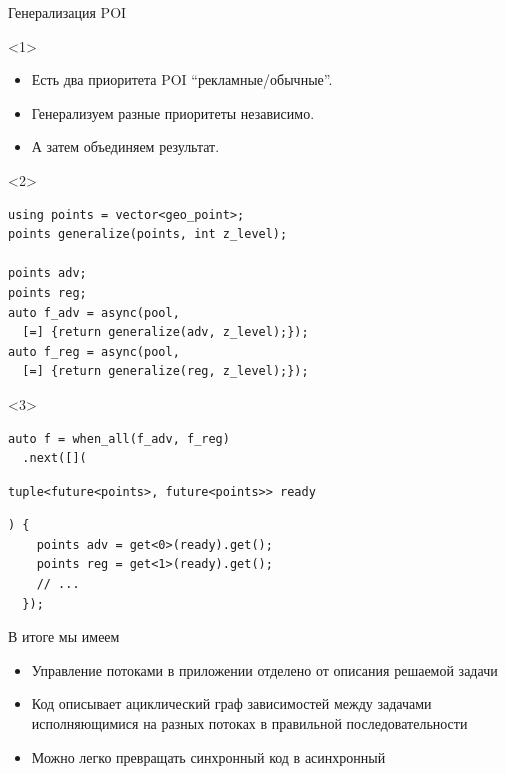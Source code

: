 \documentclass[aspectratio=169,hyperref={unicode},17pt]{beamer}
\begin{document}
\begin{frame}[fragile,t]{Генерализация POI}
\begin{onlyenv}<1>
\begin{itemize}
 \item Есть два приоритета POI ``рекламные/обычные''.
 \item Генерализуем разные приоритеты независимо.
 \item А затем объединяем результат.
\end{itemize}
\end{onlyenv}
\begin{onlyenv}<2>
\begin{lstlisting}[style=cppcode]
using points = vector<geo_point>;
points generalize(points, int z_level);

points adv;
points reg;
auto f_adv = async(pool,
  [=] {return generalize(adv, z_level);});
auto f_reg = async(pool,
  [=] {return generalize(reg, z_level);});
\end{lstlisting}
\end{onlyenv}
\begin{onlyenv}<3>
\begin{lstlisting}[style=cppcode,aboveskip=0pt,belowskip=0pt]
auto f = when_all(f_adv, f_reg)
  .next([](
\end{lstlisting}
\begin{lstlisting}[style=cppcode,backgroundcolor=\color{gray!30},aboveskip=0pt,belowskip=0pt]
    tuple<future<points>, future<points>> ready
\end{lstlisting}
\begin{lstlisting}[style=cppcode,aboveskip=0pt,belowskip=0pt]
  ) {
    points adv = get<0>(ready).get();
    points reg = get<1>(ready).get();
    // ...
  });
\end{lstlisting}
\end{onlyenv}
\end{frame}

\begin{frame}[fragile,t]{В итоге мы имеем}
\begin{itemize}[<+->]
 \item Управление потоками в приложении отделено от описания решаемой задачи
 \item Код описывает ациклический граф зависимостей между задачами исполняющимися на разных потоках в правильной последовательности
 \item Можно легко превращать синхронный код в асинхронный
\end{itemize}
\end{frame}
\end{document}
